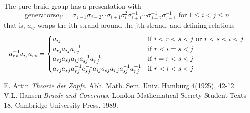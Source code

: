 \documentclass[12pt]{article}
\begin{document}
The pure braid group has a presentation with
\[ \mbox{generators} a_{ij} = \sigma_{j-1} \sigma_{j-2} \cdots \sigma_{i+1} \sigma_{i}^2 \sigma_{i+1}^{-1} \cdots \sigma_{j-2}^{-1} \sigma_{j-1}^{-1} \mbox{ for } 1 \leq i < j \leq n \]
that is, $a_{ij}$ wraps the ith strand around the jth strand, and defining relations
\[
a_{rs}^{-1}a_{ij}a_{rs} = 
\begin{cases}
a_{ij} & \text{if $ i < r < s < j \mbox{ or } r < s < i < j$}\\
a_{rj}a_{ij}a_{rj}^{-1} & \text{if $r < i = s < j$}\\
a_{rj}a_{sj}a_{ij}a_{sj}^{-1}a_{rj}^{-1} & \text{if $i = r < s < j$}\\
a_{rj}a_{sj}a_{rj}^{-1}a_{sj}^{-1}a_{ij}a_{sj}a_{rj}a_{sj}^{-1}a_{rj}^{-1} & \text{if $ r < i < s < j$}
\end{cases}
\]

\begin{thebibliography}{9}
 E. Artin {\em Theorie der Z\"opfe}. Abh. Math. Sem. Univ. Hamburg 4(1925), 42-72.
 V.L. Hansen {\em Braids and Coverings}. London Mathematical Society Student Texts 18. Cambridge University Press. 1989.
\end{thebibliography}
\end{document}
